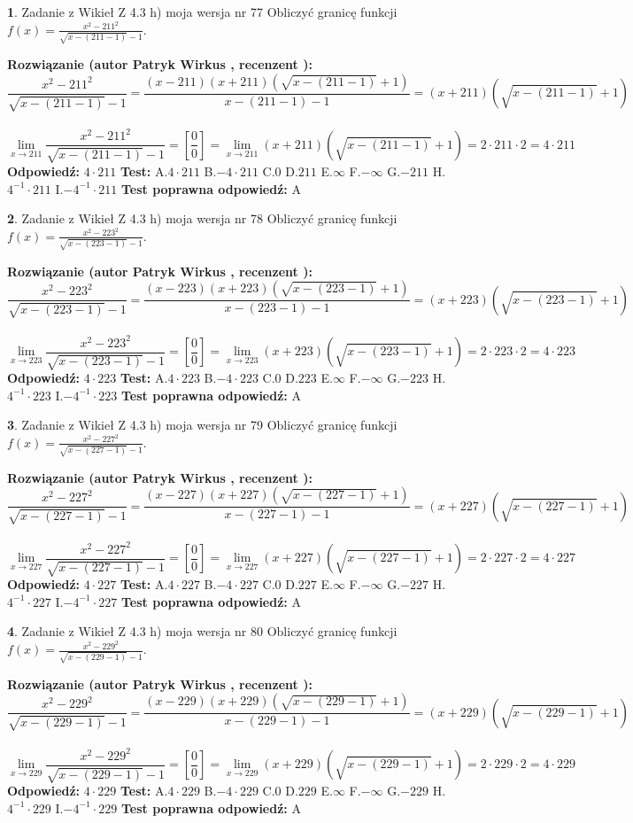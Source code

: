 \documentclass[12pt, a4paper]{article}
\theoremstyle{definition} %
\newtheorem{zad}{}
\newcommand{\zadStart}[1]{\begin{zad}#1\newline}
\newcommand{\zadStop}{\end{zad}}
\newcommand{\rozwStart}[2]{\noindent \textbf{Rozwiązanie (autor #1 , recenzent #2): }\newline}
\newcommand{\rozwStop}{\newline}
\newcommand{\odpStart}{\noindent \textbf{Odpowiedź:}\newline}
\newcommand{\odpStop}{\newline}
\newcommand{\testStart}{\noindent \textbf{Test:}\newline}
\newcommand{\testStop}{\newline}
\newcommand{\kluczStart}{\noindent \textbf{Test poprawna odpowiedź:}\newline}
\newcommand{\kluczStop}{\newline}
\begin{document}
\zadStart{Zadanie z Wikieł Z 4.3 h) moja wersja nr 77}
Obliczyć granicę funkcji $f(x)=\frac{x^{2} - 211^{2}}{\sqrt{x-(211-1)}-1}$.
\zadStop
\rozwStart{Patryk Wirkus}{}
$$\frac{x^{2} - 211^{2}}{\sqrt{x-(211-1)}-1}=\frac{(x-211)(x+211)(\sqrt{x-(211-1)}+1)}{x-(211-1)-1}=(x+211)(\sqrt{x-(211-1)}+1)$$
\\
$$\lim\limits_{x\to 211}\frac{x^{2} - 211^{2}}{\sqrt{x-(211-1)}-1}=[\frac{0}{0}]=
\lim\limits_{x\to 211}(x+211)(\sqrt{x-(211-1)}+1) = 2\cdot211 \cdot 2 = 4 \cdot 211$$
\rozwStop
\odpStart
$4\cdot211$
\odpStop
\testStart
A.$4\cdot211$
B.$-4\cdot211$
C.$0$
D.$211$
E.$\infty$
F.$-\infty$
G.$-211$
H.$4^{-1}\cdot211$
I.$-4^{-1}\cdot211$
\testStop
\kluczStart
A
\kluczStop



\zadStart{Zadanie z Wikieł Z 4.3 h) moja wersja nr 78}
Obliczyć granicę funkcji $f(x)=\frac{x^{2} - 223^{2}}{\sqrt{x-(223-1)}-1}$.
\zadStop
\rozwStart{Patryk Wirkus}{}
$$\frac{x^{2} - 223^{2}}{\sqrt{x-(223-1)}-1}=\frac{(x-223)(x+223)(\sqrt{x-(223-1)}+1)}{x-(223-1)-1}=(x+223)(\sqrt{x-(223-1)}+1)$$
\\
$$\lim\limits_{x\to 223}\frac{x^{2} - 223^{2}}{\sqrt{x-(223-1)}-1}=[\frac{0}{0}]=
\lim\limits_{x\to 223}(x+223)(\sqrt{x-(223-1)}+1) = 2\cdot223 \cdot 2 = 4 \cdot 223$$
\rozwStop
\odpStart
$4\cdot223$
\odpStop
\testStart
A.$4\cdot223$
B.$-4\cdot223$
C.$0$
D.$223$
E.$\infty$
F.$-\infty$
G.$-223$
H.$4^{-1}\cdot223$
I.$-4^{-1}\cdot223$
\testStop
\kluczStart
A
\kluczStop



\zadStart{Zadanie z Wikieł Z 4.3 h) moja wersja nr 79}
Obliczyć granicę funkcji $f(x)=\frac{x^{2} - 227^{2}}{\sqrt{x-(227-1)}-1}$.
\zadStop
\rozwStart{Patryk Wirkus}{}
$$\frac{x^{2} - 227^{2}}{\sqrt{x-(227-1)}-1}=\frac{(x-227)(x+227)(\sqrt{x-(227-1)}+1)}{x-(227-1)-1}=(x+227)(\sqrt{x-(227-1)}+1)$$
\\
$$\lim\limits_{x\to 227}\frac{x^{2} - 227^{2}}{\sqrt{x-(227-1)}-1}=[\frac{0}{0}]=
\lim\limits_{x\to 227}(x+227)(\sqrt{x-(227-1)}+1) = 2\cdot227 \cdot 2 = 4 \cdot 227$$
\rozwStop
\odpStart
$4\cdot227$
\odpStop
\testStart
A.$4\cdot227$
B.$-4\cdot227$
C.$0$
D.$227$
E.$\infty$
F.$-\infty$
G.$-227$
H.$4^{-1}\cdot227$
I.$-4^{-1}\cdot227$
\testStop
\kluczStart
A
\kluczStop



\zadStart{Zadanie z Wikieł Z 4.3 h) moja wersja nr 80}
Obliczyć granicę funkcji $f(x)=\frac{x^{2} - 229^{2}}{\sqrt{x-(229-1)}-1}$.
\zadStop
\rozwStart{Patryk Wirkus}{}
$$\frac{x^{2} - 229^{2}}{\sqrt{x-(229-1)}-1}=\frac{(x-229)(x+229)(\sqrt{x-(229-1)}+1)}{x-(229-1)-1}=(x+229)(\sqrt{x-(229-1)}+1)$$
\\
$$\lim\limits_{x\to 229}\frac{x^{2} - 229^{2}}{\sqrt{x-(229-1)}-1}=[\frac{0}{0}]=
\lim\limits_{x\to 229}(x+229)(\sqrt{x-(229-1)}+1) = 2\cdot229 \cdot 2 = 4 \cdot 229$$
\rozwStop
\odpStart
$4\cdot229$
\odpStop
\testStart
A.$4\cdot229$
B.$-4\cdot229$
C.$0$
D.$229$
E.$\infty$
F.$-\infty$
G.$-229$
H.$4^{-1}\cdot229$
I.$-4^{-1}\cdot229$
\testStop
\kluczStart
A
\kluczStop
\end{document}
